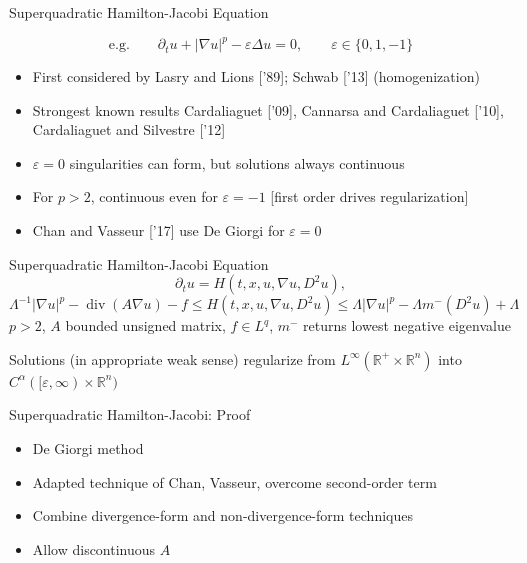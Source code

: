 \documentclass{beamer}
\newcommand{\R}{\mathbb{R}}
\newcommand{\eps}{\varepsilon}
\newcommand{\paren}[1]{\left( #1 \right)}
\newcommand{\del}{\partial}
\newcommand{\grad}{\nabla}
\renewcommand{\div}{\operatorname{div}}
\newcommand{\Laplace}{\Delta}
\newcommand{\n}{^{-1}}
\begin{document}

\begin{frame}{Superquadratic Hamilton-Jacobi Equation}
\pause

\[\textrm{e.g.} \qquad \del_t u + |\grad u|^p - \eps \Laplace u = 0, \qquad \eps \in \{0,1,-1\} \]

\begin{itemize}
\item First considered by Lasry and Lions ['89]; Schwab ['13] (homogenization)
\item Strongest known results Cardaliaguet ['09], Cannarsa and Cardaliaguet ['10], Cardaliaguet and Silvestre ['12]
\item $\eps = 0$ singularities can form, but solutions always continuous
\item For $p > 2$, continuous even for $\eps = -1$ [first order drives regularization]
\item Chan and Vasseur ['17] use De Giorgi for $\eps = 0$
\end{itemize}

\end{frame}


\begin{frame}{Superquadratic Hamilton-Jacobi Equation}
\[ \del_t u = H\paren{t,x,u,\grad u, D^2 u}, \]
\[ \Lambda\n |\grad u|^p - \div\paren{A \grad u} - f \leq H\paren{t,x,u,\grad u, D^2 u} \leq \Lambda |\grad u|^p - \Lambda m^-(D^2 u) + \Lambda \]
$p > 2$, $A$ bounded unsigned matrix, $f \in L^q$, $m^-$ returns lowest negative eigenvalue

\begin{theorem}[S., Vasseur [CMS, '18{]}]
Solutions (in appropriate weak sense) regularize from $L^\infty(\R^+\times\R^n)$ into $C^\alpha([\eps,\infty)\times \R^n)$
\end{theorem}
\end{frame}


\begin{frame}{Superquadratic Hamilton-Jacobi: Proof}
\begin{itemize}
\item De Giorgi method
\item Adapted technique of Chan, Vasseur, overcome second-order term
\item Combine divergence-form and non-divergence-form techniques
\item Allow discontinuous $A$
\end{itemize}
\end{frame}
\end{document}
